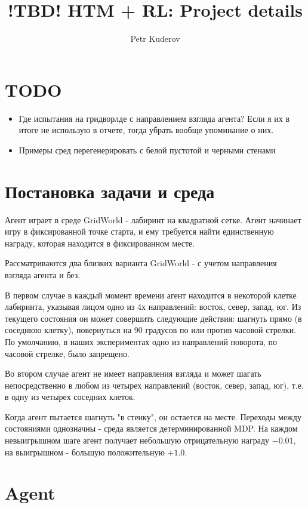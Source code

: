 \documentclass[a4paper]{article}
\begin{document}
\title {!TBD! HTM + RL: Project details}
\author {Petr Kuderov}
\maketitle

\section{TODO}

\begin{itemize}
  \item Где испытания на гридворлде с направлением взгляда агента? Если я их в итоге не использую в отчете, тогда убрать вообще упоминание о них.
  \item Примеры сред перегенерировать с белой пустотой и черными стенами
\end{itemize}

\section {Постановка задачи и среда}

Агент играет в среде GridWorld - лабиринт на квадратной сетке. Агент начинает игру в фиксированной точке старта, и ему требуется найти единственную награду, которая находится в фиксированном месте.

Рассматриваются два близких варианта GridWorld - с учетом направления взгляда агента и без.

В первом случае в каждый момент времени агент находится в некоторой клетке лабиринта, указывая лицом одно из 4х направлений: восток, север, запад, юг. Из текущего состояния он может совершить следующие действия: шагнуть прямо (в соседнюю клетку), повернуться на 90 градусов по или против часовой стрелки. По умолчанию, в наших экспериментах одно из направлений поворота, по часовой стрелке, было запрещено.

Во втором случае агент не имеет направления взгляда и может шагать непосредственно в любом из четырех направлений (восток, север, запад, юг), т.е. в одну из четырех соседних клеток.

Когда агент пытается шагнуть "в стенку", он остается на месте. Переходы между состояниями однозначны - среда является детерминированной MDP. На каждом невыигрышном шаге агент получает небольшую отрицательную награду $-0.01$, на выигрышном - большую положительную $+1.0$.

\section{Agent}
\end{document}
